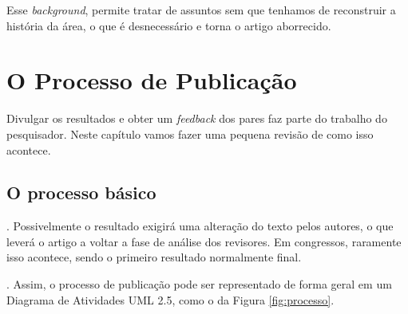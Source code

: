 \documentclass[openany]{book}
\begin{document}
 Esse \textit{background}, permite tratar de assuntos sem que tenhamos de reconstruir a história da área, o que é desnecessário e torna o artigo aborrecido.




\chapter{O Processo de Publicação}

 Divulgar os resultados e obter um \textit{feedback} dos pares faz parte do trabalho do pesquisador. Neste capítulo vamos fazer uma pequena revisão de como isso acontece.

\section{O processo básico}

. Possivelmente o resultado exigirá uma alteração do texto pelos autores, o que leverá o artigo a voltar a fase de análise dos revisores. Em congressos, raramente isso acontece, sendo o primeiro resultado normalmente final.

. Assim, o processo de publicação pode ser representado de forma geral em um Diagrama de Atividades UML 2.5, como o da Figura \ref{fig:processo}.
\end{document}
